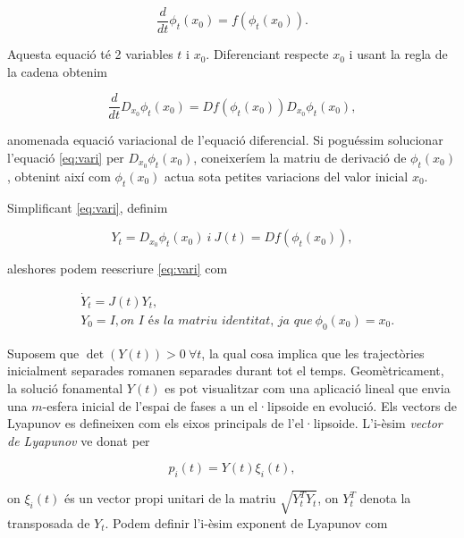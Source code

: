\documentclass[11pt,a4paper,openright,oneside]{article}
\numberwithin{equation}{section}
\theoremstyle{definition}
\begin{document}
\begin{equation*}
    \frac{d}{dt}\phi_t(x_0)=f\left(\phi_t(x_0)\right).
\end{equation*}

Aquesta equació té 2 variables $t$ i $x_0$. Diferenciant respecte $x_0$ i usant la regla de la cadena obtenim

\begin{equation} \label{eq:vari}
    \frac{d}{dt}D_{x_0}\phi_t(x_0)=Df\left(\phi_t(x_0)\right)D_{x_0}\phi_t(x_0),
\end{equation}

anomenada equació variacional de l'equació diferencial. Si poguéssim solucionar l'equació \eqref{eq:vari} per $D_{x_0}\phi_t(x_0)$, coneixeríem la matriu de derivació de $\phi_t(x_0)$, obtenint així com $\phi_t(x_0)$ actua sota petites variacions del valor inicial $x_0$.

Simplificant \eqref{eq:vari}, definim

\begin{equation*}
    Y_t=D_{x_0}\phi_t(x_0) \ i \ J(t)=Df\left(\phi_t(x_0)\right),
\end{equation*}

aleshores podem reescriure  \eqref{eq:vari} com 

\begin{equation} \begin{aligned}\label{eq:variacional_lyapunov}
    &\dot{Y}_t=J(t)Y_t, \\
    &Y_0=I, \textit{on I és la matriu identitat, ja que} \ \phi_0(x_0)=x_0.
\end{aligned}\end{equation}

Suposem que $\det\left(Y(t)\right)>0 \ \forall t$, la qual cosa implica que les trajectòries inicialment separades romanen separades durant tot el temps. Geomètricament, la solució fonamental $Y(t)$ es pot visualitzar com una aplicació lineal que envia una $m$-esfera inicial de l'espai de fases a un el·lipsoide en evolució. Els vectors de Lyapunov es defineixen com els eixos principals de l'el·lipsoide. L'i-èsim \textit{vector de Lyapunov} ve donat per

\begin{equation*}
    p_i(t)=Y\left(t\right)\xi_i\left(t\right),
\end{equation*}

on $\xi_i(t)$ és un vector propi unitari de la matriu $\sqrt{Y_t^T Y_t}$, on $Y_t^T$ denota la transposada de $Y_t$. Podem definir l'i-èsim exponent de Lyapunov com
\end{document}
